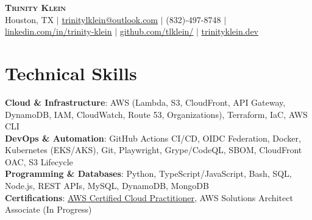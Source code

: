\documentclass[letterpaper,11pt]{article}
\begin{document}
\begin{center}
    \textbf{\Huge \scshape Trinity Klein} \\ \vspace{1pt}
    \small Houston, TX $|$ \href{mailto:trinitylklein@outlook.com}{\underline{trinitylklein@outlook.com}} $|$
    \small (832)-497-8748 $|$
    \href{https://linkedin.com/in/trinity-klein}{\underline{linkedin.com/in/trinity-klein}} $|$
    \href{https://github.com/tlklein/}{\underline{github.com/tlklein/}} $|$
    \href{https://trinityklein.dev}{\underline{trinityklein.dev}}
\end{center}

\section{Technical Skills}
 \begin{itemize}[leftmargin=0.15in, label={}]
     \small{\item{
        \textbf{Cloud \& Infrastructure}{: AWS (Lambda, S3, CloudFront, API Gateway, DynamoDB, IAM, CloudWatch, Route 53, Organizations), Terraform, IaC, AWS CLI} \\
        \textbf{DevOps \& Automation}{: GitHub Actions CI/CD, OIDC Federation, Docker, Kubernetes (EKS/AKS), Git, Playwright, Grype/CodeQL, SBOM, CloudFront OAC, S3 Lifecycle} \\
        \textbf{Programming \& Databases}{: Python, TypeScript/JavaScript, Bash, SQL, Node.js, REST APIs, MySQL, DynamoDB, MongoDB} \\
        \textbf{Certifications}{: \href{https://www.credly.com/badges/9ab1424b-f346-4461-a1b7-829dc8591cd9}{\underline{AWS Certified Cloud Practitioner}}, AWS Solutions Architect Associate (In Progress)}
    }}
 \end{itemize}


\end{document}
